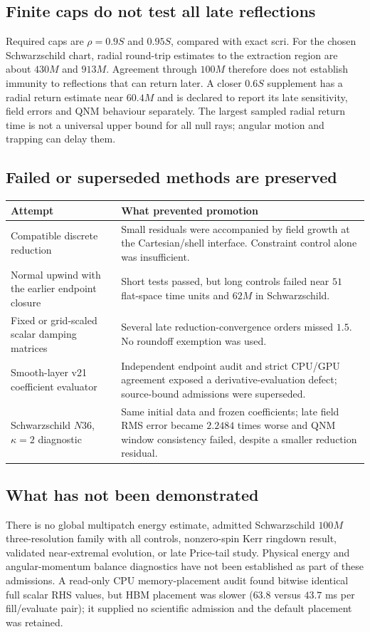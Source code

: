 \documentclass[11pt,letterpaper]{article}
\begin{document}
\subsection{Finite caps do not test all late reflections}
Required caps are $\rho=0.9S$ and $0.95S$, compared with exact scri. For the chosen Schwarzschild chart, radial round-trip estimates to the extraction region are about $430M$ and $913M$. Agreement through $100M$ therefore does not establish immunity to reflections that can return later. A closer $0.6S$ supplement has a radial return estimate near $60.4M$ and is declared to report its late sensitivity, field errors and QNM behaviour separately. The largest sampled radial return time is not a universal upper bound for all null rays; angular motion and trapping can delay them.

\subsection{Failed or superseded methods are preserved}
\begin{center}\small
\begin{tabularx}{\linewidth}{@{}p{3.4cm}X@{}}\toprule
Attempt & What prevented promotion \\\midrule
Compatible discrete reduction & Small residuals were accompanied by field growth at the Cartesian/shell interface. Constraint control alone was insufficient. \\
Normal upwind with the earlier endpoint closure & Short tests passed, but long controls failed near $51$ flat-space time units and $62M$ in Schwarzschild. \\
Fixed or grid-scaled scalar damping matrices & Several late reduction-convergence orders missed $1.5$. No roundoff exemption was used. \\
Smooth-layer v21 coefficient evaluator & Independent endpoint audit and strict CPU/GPU agreement exposed a derivative-evaluation defect; source-bound admissions were superseded. \\
Schwarzschild $N36$, $\kappa=2$ diagnostic & Same initial data and frozen coefficients; late field RMS error became $2.2484$ times worse and QNM window consistency failed, despite a smaller reduction residual. \\\bottomrule
\end{tabularx}\end{center}

\subsection{What has not been demonstrated}
There is no global multipatch energy estimate, admitted Schwarzschild $100M$ three-resolution family with all controls, nonzero-spin Kerr ringdown result, validated near-extremal evolution, or late Price-tail study. Physical energy and angular-momentum balance diagnostics have not been established as part of these admissions. A read-only CPU memory-placement audit found bitwise identical full scalar RHS values, but HBM placement was slower ($63.8$ versus $43.7$ ms per fill/evaluate pair); it supplied no scientific admission and the default placement was retained.
\end{document}
